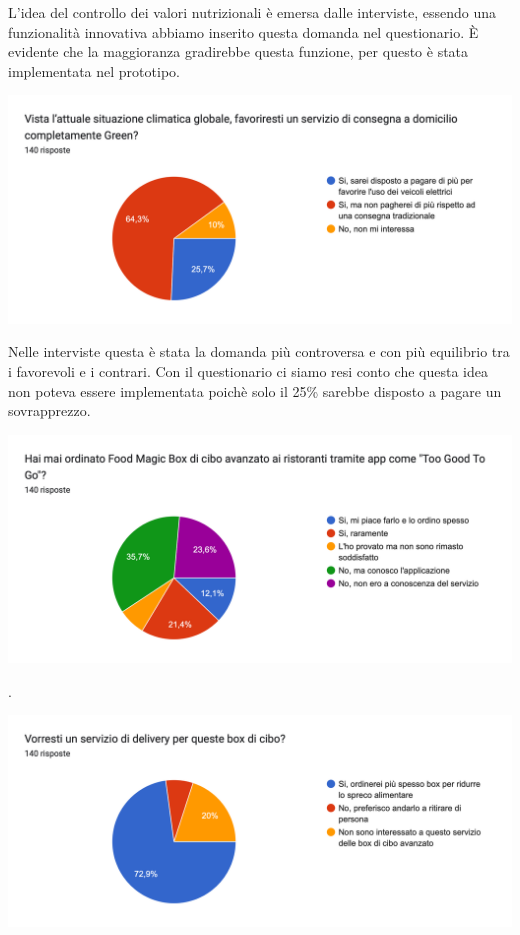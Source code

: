 \documentclass{article}
\begin{document}
L'idea del controllo dei valori nutrizionali è emersa dalle interviste, essendo una funzionalità innovativa abbiamo inserito questa domanda nel questionario. È evidente che la maggioranza gradirebbe questa funzione, per questo è stata implementata nel prototipo.\par \vspace{1cm}
\includegraphics[width=\textwidth]{Data/Grafici/situazione_climatica.png}\par
Nelle interviste questa è stata la domanda più controversa e con più equilibrio tra i favorevoli e i contrari. Con il questionario ci siamo resi conto che questa idea non poteva essere implementata poichè solo il 25\% sarebbe disposto a pagare un sovrapprezzo. \par \vspace{1cm}
\includegraphics[width=\textwidth]{Data/Grafici/too_good_too_go.png}\par
.\par \vspace{1cm}
\includegraphics[width=\textwidth]{Data/Grafici/totg_delivery.png} \par
\end{document}
